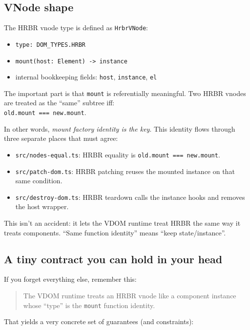 \subsection{VNode shape}

The HRBR vnode type is defined as \texttt{HrbrVNode}:

\begin{itemize}
\item \texttt{type: DOM\_TYPES.HRBR}
\item \texttt{mount(host: Element) -> instance}
\item internal bookkeeping fields: \texttt{host}, \texttt{instance}, \texttt{el}
\end{itemize}

The important part is that \texttt{mount} is referentially meaningful. Two HRBR vnodes are treated as the ``same'' subtree iff:\\
	\texttt{old.mount === new.mount}.

In other words, \emph{mount factory identity is the key}. This identity flows through three separate places that must agree:

\begin{itemize}
\item \texttt{src/nodes-equal.ts}: HRBR equality is \texttt{old.mount === new.mount}.
\item \texttt{src/patch-dom.ts}: HRBR patching reuses the mounted instance on that same condition.
\item \texttt{src/destroy-dom.ts}: HRBR teardown calls the instance hooks and removes the host wrapper.
\end{itemize}

This isn't an accident: it lets the VDOM runtime treat HRBR the same way it treats components. ``Same function identity'' means ``keep state/instance''.

\subsection{A tiny contract you can hold in your head}

If you forget everything else, remember this:

\begin{quote}
The VDOM runtime treats an HRBR vnode like a component instance whose ``type'' is the \texttt{mount} function identity.
\end{quote}

That yields a very concrete set of guarantees (and constraints):

